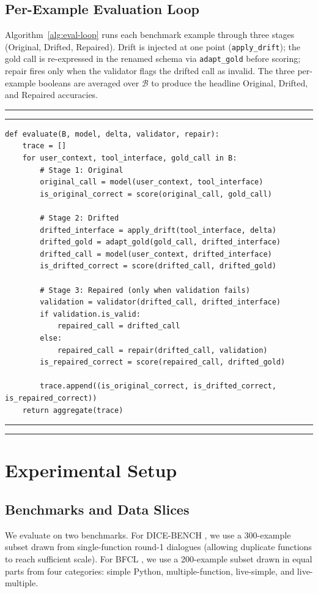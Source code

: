 \documentclass{svproc}
\newcommand{\algodoublerule}{%
  \par\noindent\rule{\linewidth}{0.5pt}\par\nointerlineskip\vspace{1pt}\noindent\rule{\linewidth}{0.5pt}\par
}
\begin{document}
\subsection{Per-Example Evaluation Loop}
\label{subsec:eval-loop}

Algorithm~\ref{alg:eval-loop} runs each benchmark example through three stages
(Original, Drifted, Repaired). Drift is injected at one point
(\texttt{apply\_drift}); the gold call is re-expressed in the renamed schema
via \texttt{adapt\_gold} before scoring; repair fires only when the validator
flags the drifted call as invalid. The three per-example booleans are averaged
over $\mathcal{B}$ to produce the headline Original, Drifted, and Repaired
accuracies.

\algodoublerule
\begin{lstlisting}[style=algopy,caption={Per-example evaluation under interface drift.},label={alg:eval-loop}]
def evaluate(B, model, delta, validator, repair):
    trace = []
    for user_context, tool_interface, gold_call in B:
        # Stage 1: Original
        original_call = model(user_context, tool_interface)
        is_original_correct = score(original_call, gold_call)

        # Stage 2: Drifted
        drifted_interface = apply_drift(tool_interface, delta)
        drifted_gold = adapt_gold(gold_call, drifted_interface)
        drifted_call = model(user_context, drifted_interface)
        is_drifted_correct = score(drifted_call, drifted_gold)

        # Stage 3: Repaired (only when validation fails)
        validation = validator(drifted_call, drifted_interface)
        if validation.is_valid:
            repaired_call = drifted_call
        else:
            repaired_call = repair(drifted_call, validation)
        is_repaired_correct = score(repaired_call, drifted_gold)

        trace.append((is_original_correct, is_drifted_correct, is_repaired_correct))
    return aggregate(trace)
\end{lstlisting}
\algodoublerule

\section{Experimental Setup}
\subsection{Benchmarks and Data Slices}
We evaluate on two benchmarks. For DICE-BENCH \cite{jang2025dicebench}, we use a
300-example subset drawn from single-function round-1 dialogues (allowing duplicate
functions to reach sufficient scale). For BFCL \cite{bfcl2024}, we use a 200-example
subset drawn in equal parts from four categories: simple Python, multiple-function,
live-simple, and live-multiple.
\end{document}
